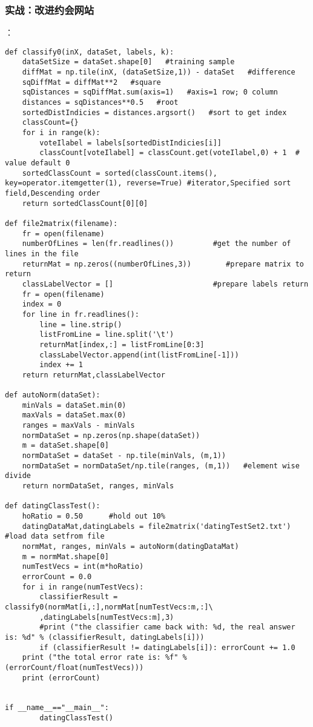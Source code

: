 \subsubsection{实战：改进约会网站}
：
\begin{lstlisting}
def classify0(inX, dataSet, labels, k):
    dataSetSize = dataSet.shape[0]   #training sample
    diffMat = np.tile(inX, (dataSetSize,1)) - dataSet   #difference
    sqDiffMat = diffMat**2   #square
    sqDistances = sqDiffMat.sum(axis=1)   #axis=1 row; 0 column
    distances = sqDistances**0.5   #root
    sortedDistIndicies = distances.argsort()   #sort to get index
    classCount={}
    for i in range(k):
        voteIlabel = labels[sortedDistIndicies[i]]
        classCount[voteIlabel] = classCount.get(voteIlabel,0) + 1  # value default 0
    sortedClassCount = sorted(classCount.items(), key=operator.itemgetter(1), reverse=True) #iterator,Specified sort field,Descending order
    return sortedClassCount[0][0]

def file2matrix(filename):
    fr = open(filename)
    numberOfLines = len(fr.readlines())         #get the number of lines in the file
    returnMat = np.zeros((numberOfLines,3))        #prepare matrix to return
    classLabelVector = []                       #prepare labels return
    fr = open(filename)
    index = 0
    for line in fr.readlines():
        line = line.strip()
        listFromLine = line.split('\t')
        returnMat[index,:] = listFromLine[0:3]
        classLabelVector.append(int(listFromLine[-1]))
        index += 1
    return returnMat,classLabelVector

def autoNorm(dataSet):
    minVals = dataSet.min(0)
    maxVals = dataSet.max(0)
    ranges = maxVals - minVals
    normDataSet = np.zeros(np.shape(dataSet))
    m = dataSet.shape[0]
    normDataSet = dataSet - np.tile(minVals, (m,1))
    normDataSet = normDataSet/np.tile(ranges, (m,1))   #element wise divide
    return normDataSet, ranges, minVals

def datingClassTest():
    hoRatio = 0.50      #hold out 10%
    datingDataMat,datingLabels = file2matrix('datingTestSet2.txt')       #load data setfrom file
    normMat, ranges, minVals = autoNorm(datingDataMat)
    m = normMat.shape[0]
    numTestVecs = int(m*hoRatio)
    errorCount = 0.0
    for i in range(numTestVecs):
        classifierResult = classify0(normMat[i,:],normMat[numTestVecs:m,:]\
        ,datingLabels[numTestVecs:m],3)
        #print ("the classifier came back with: %d, the real answer is: %d" % (classifierResult, datingLabels[i]))
        if (classifierResult != datingLabels[i]): errorCount += 1.0
    print ("the total error rate is: %f" % (errorCount/float(numTestVecs)))
    print (errorCount)


if __name__=="__main__":
        datingClassTest()
\end{lstlisting}

